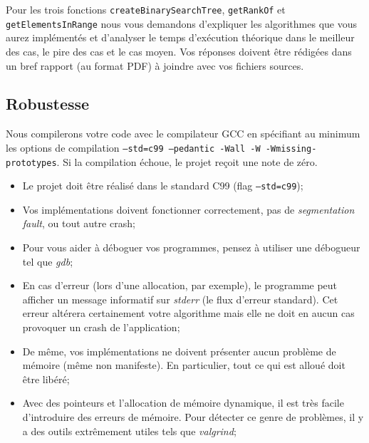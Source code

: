 \documentclass[a4paper,10pt]{article}
\begin{document}
Pour les trois fonctions \texttt{createBinarySearchTree}, \texttt{getRankOf} et \texttt{getElementsInRange} nous vous demandons d'expliquer les algorithmes que vous aurez implémentés et d'analyser le temps d'exécution théorique dans le meilleur des cas, le pire des cas et le cas moyen. Vos réponses doivent être rédigées dans un bref rapport (au format PDF) à joindre avec vos fichiers sources.

\subsection*{Robustesse}

Nous compilerons votre code avec le compilateur GCC en spécifiant au
minimum les options de compilation \texttt{--std=c99 --pedantic -Wall -W -Wmissing-
prototypes}. Si la compilation échoue, le projet reçoit une note de zéro.

\begin{itemize}
\item Le projet doit être réalisé dans le standard C99 (flag \texttt{--std=c99});
\item Vos implémentations doivent fonctionner correctement, pas de {\em segmentation fault}, ou tout autre crash;
\item Pour vous aider à déboguer vos programmes, pensez à utiliser une débogueur tel que {\em gdb};
\item En cas d'erreur (lors d'une allocation, par exemple), le programme peut afficher un message informatif sur {\em stderr} (le flux d'erreur standard). Cet erreur altérera certainement votre algorithme mais elle ne doit en aucun cas provoquer un crash de l'application;
\item De même, vos implémentations ne doivent présenter aucun problème de mémoire (même non manifeste). En particulier, tout ce qui est alloué doit être libéré;
\item Avec des pointeurs et l’allocation de mémoire dynamique, il est très facile d’introduire des erreurs de mémoire. Pour détecter ce genre de problèmes, il y a des outils extrêmement utiles tels que {\em valgrind};
\end{itemize}
\end{document}
